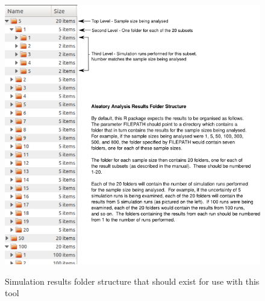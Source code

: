 \documentclass[a4paper,11pt]{article}
\begin{document}
\begin{figure}
\centering
    \includegraphics[width=\textwidth]{AA_Folder_Struc.png}\\ \noindent
    \caption{Simulation results folder structure that should exist for use with this tool}
    \label{AA_Folders}
    \newpage 
\end{figure}
\end{document}
